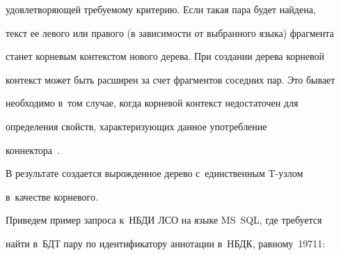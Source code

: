 удовлетворяющей требуемому критерию. Если такая пара будет найдена, 


текст ее левого или правого (в зависимости от выбранного языка) фрагмента 


станет корневым контекстом нового дерева. При создании дерева корневой 


контекст может быть расширен за счет фрагментов соседних пар. Это бывает 


необходимо в~том случае, когда корневой контекст недостаточен для 


определения свойств, характеризующих данное употребление 


коннектора~\cite{16-dur}.


  


  В результате создается вырожденное дерево с~единственным T-уз\-лом 


в~качестве корневого.


  


  Приведем пример запроса к~НБДИ ЛСО на языке MS~SQL, где требуется 


найти в~БДТ пару по идентификатору аннотации в~НБДК, равному~19711:





 \noindent


